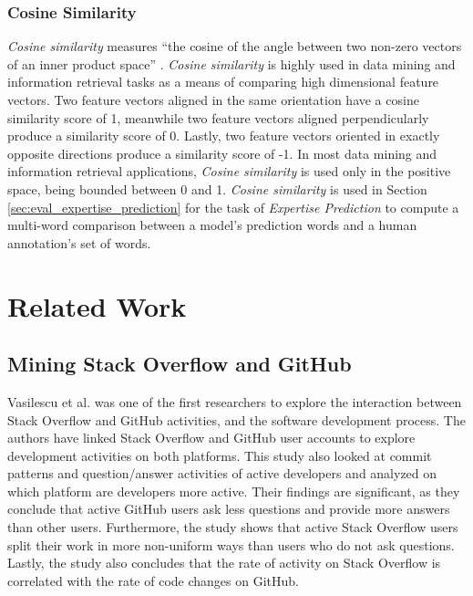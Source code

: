        \subsubsection{Cosine Similarity}
            \emph{Cosine similarity} measures ``the cosine of the angle between two non-zero vectors of an inner product space'' \cite{cosSim_def}. \emph{Cosine similarity} is highly used in data mining and information retrieval tasks as a means of comparing high dimensional feature vectors. Two feature vectors aligned in the same orientation have a cosine similarity score of 1, meanwhile two feature vectors aligned perpendicularly produce a similarity score of 0. Lastly, two feature vectors oriented in exactly opposite directions produce a similarity score of -1. In most data mining and information retrieval applications, \emph{Cosine similarity} is used only in the positive space, being bounded between 0 and 1. \emph{Cosine similarity} is used in Section \ref{sec:eval_expertise_prediction} for the task of \emph{Expertise Prediction} to compute a multi-word comparison between a model's prediction words and a human annotation's set of words.
            

\section{Related Work}\label{sec:relatedWork}

    \subsection{Mining Stack Overflow and GitHub}
        Vasilescu et al. \cite{vasilescu2013stackoverflow} was one of the first researchers to explore the interaction between Stack Overflow and GitHub activities, and the software development process. The authors have linked Stack Overflow and GitHub user accounts to explore development activities on both platforms. This study also looked at commit patterns and question/answer activities of active developers and analyzed on which platform are developers more active. Their findings are significant, as they conclude that active GitHub users ask less questions and provide more answers than other users. Furthermore, the study shows that active Stack Overflow users split their work in more non-uniform ways than users who do not ask questions. Lastly, the study also concludes that the rate of activity on Stack Overflow is correlated with the rate of code changes on GitHub.
        
